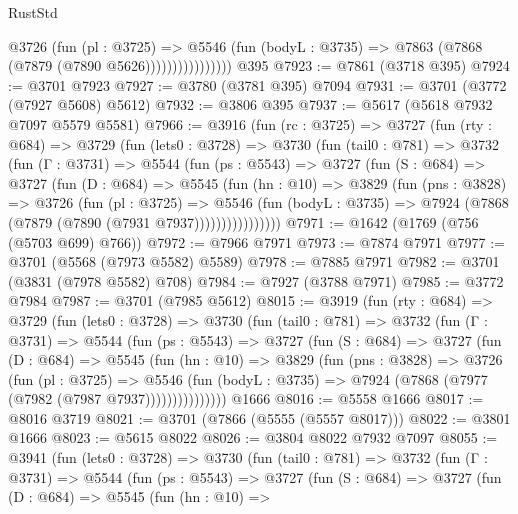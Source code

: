 \begin{lexlean}{RustStd}
\begin{coremodule}
{\begin{coremodule}
{{{{{{{{{{{{{{                        @3726
                          (fun (pl : @3725) =>
                          @5546
                            (fun (bodyL : @3735) => @7863 (@7868 (@7879 (@7890 @5626))))))))))))))))
    @395
@7923 := @7861 (@3718 @395)
@7924 := @3701 @7923
@7927 := @3780 (@3781 @395) @7094
@7931 := @3701 (@3772 (@7927 @5608) @5612)
@7932 := @3806 @395
@7937 := @5617 (@5618 @7932 @7097 @5579 @5581)
@7966 := @3916
    (fun (rc : @3725) =>
    @3727
      (fun (rty : @684) =>
      @3729
        (fun (lets0 : @3728) =>
        @3730
          (fun (tail0 : @781) =>
          @3732
            (fun (Γ : @3731) =>
            @5544
              (fun (ps : @5543) =>
              @3727
                (fun (S : @684) =>
                @3727
                  (fun (D : @684) =>
                  @5545
                    (fun (hn : @10) =>
                    @3829
                      (fun (pns : @3828) =>
                      @3726
                        (fun (pl : @3725) =>
                        @5546
                          (fun (bodyL : @3735) =>
                          @7924 (@7868 (@7879 (@7890 (@7931 @7937))))))))))))))))
@7971 := @1642 (@1769 (@756 (@5703 @699) @766))
@7972 := @7966 @7971
@7973 := @7874 @7971
@7977 := @3701 (@5568 (@7973 @5582) @5589)
@7978 := @7885 @7971
@7982 := @3701 (@3831 (@7978 @5582) @708)
@7984 := @7927 (@3788 @7971)
@7985 := @3772 @7984
@7987 := @3701 (@7985 @5612)
@8015 := @3919
    (fun (rty : @684) =>
    @3729
      (fun (lets0 : @3728) =>
      @3730
        (fun (tail0 : @781) =>
        @3732
          (fun (Γ : @3731) =>
          @5544
            (fun (ps : @5543) =>
            @3727
              (fun (S : @684) =>
              @3727
                (fun (D : @684) =>
                @5545
                  (fun (hn : @10) =>
                  @3829
                    (fun (pns : @3828) =>
                    @3726
                      (fun (pl : @3725) =>
                      @5546
                        (fun (bodyL : @3735) =>
                        @7924 (@7868 (@7977 (@7982 (@7987 @7937)))))))))))))))
    @1666
@8016 := @5558 @1666
@8017 := @8016 @3719
@8021 := @3701 (@7866 (@5555 (@5557 @8017)))
@8022 := @3801 @1666
@8023 := @5615 @8022
@8026 := @3804 @8022 @7932 @7097
@8055 := @3941
    (fun (lets0 : @3728) =>
    @3730
      (fun (tail0 : @781) =>
      @3732
        (fun (Γ : @3731) =>
        @5544
          (fun (ps : @5543) =>
          @3727
            (fun (S : @684) =>
            @3727
              (fun (D : @684) =>
              @5545
                (fun (hn : @10) =>
}}}}}}}}}}}}}}
\end{coremodule}}
\end{coremodule}
\end{lexlean}

